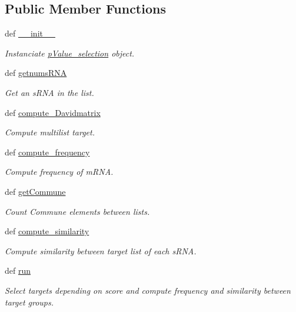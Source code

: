 \subsection*{\-Public \-Member \-Functions}
\begin{DoxyCompactItemize}
\item 
def \hyperlink{classirna_1_1iRNA__stat_1_1pValue__selection_1_1pValue__selection_a75776df19494e4f894138395e16113d7}{\-\_\-\-\_\-init\-\_\-\-\_\-}
\begin{DoxyCompactList}\small\item\em \-Instanciate \hyperlink{classirna_1_1iRNA__stat_1_1pValue__selection_1_1pValue__selection}{p\-Value\-\_\-selection} object. \end{DoxyCompactList}\item 
def \hyperlink{classirna_1_1iRNA__stat_1_1pValue__selection_1_1pValue__selection_a3e42b65207bef845b47b3aeeffed2405}{getnums\-R\-N\-A}
\begin{DoxyCompactList}\small\item\em \-Get an s\-R\-N\-A in the list. \end{DoxyCompactList}\item 
def \hyperlink{classirna_1_1iRNA__stat_1_1pValue__selection_1_1pValue__selection_a7249136c7f495abff8f740ef89b26285}{compute\-\_\-\-Davidmatrix}
\begin{DoxyCompactList}\small\item\em \-Compute multilist target. \end{DoxyCompactList}\item 
def \hyperlink{classirna_1_1iRNA__stat_1_1pValue__selection_1_1pValue__selection_a1d0e3c3084feef92ae8508c8fc120882}{compute\-\_\-frequency}
\begin{DoxyCompactList}\small\item\em \-Compute frequency of m\-R\-N\-A. \end{DoxyCompactList}\item 
def \hyperlink{classirna_1_1iRNA__stat_1_1pValue__selection_1_1pValue__selection_a02f6f7d49cac4d4902f603d400e15bdd}{get\-Commune}
\begin{DoxyCompactList}\small\item\em \-Count \-Commune elements between lists. \end{DoxyCompactList}\item 
def \hyperlink{classirna_1_1iRNA__stat_1_1pValue__selection_1_1pValue__selection_a16a2de4fb7655f1811f8419e86c19df3}{compute\-\_\-similarity}
\begin{DoxyCompactList}\small\item\em \-Compute similarity between target list of each s\-R\-N\-A. \end{DoxyCompactList}\item 
def \hyperlink{classirna_1_1iRNA__stat_1_1pValue__selection_1_1pValue__selection_a9af5a4b1136a774e4be72135d5d729f4}{run}
\begin{DoxyCompactList}\small\item\em \-Select targets depending on score and compute frequency and similarity between target groups. \end{DoxyCompactList}\end{DoxyCompactItemize}
